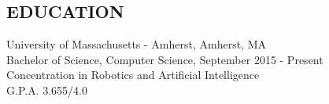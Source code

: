 \documentclass{res}
\begin{document}
 

\address{\bf  PRESENT ADDRESS\\145 Commonwealth Avenue\\Elm 401A\\Amherst, MA 01003-9253\\(862) 219-2190}
\address{\bf PERMANENT ADDRESS \\ 93 Minnehaha Blvd. \\  Lake Hiawatha, NJ 07034 \\  (908) 902-2202}
\begin{resume}
\section{EDUCATION}          
    University of Massachusetts - Amherst, Amherst, MA  \\        
    Bachelor of Science, Computer Science, September 2015 - Present   \\       
    Concentration in Robotics and Artificial Intelligence       \\
    G.P.A. 3.655/4.0    
    \vspace{-0.2in}

\end{resume}
\end{document}

